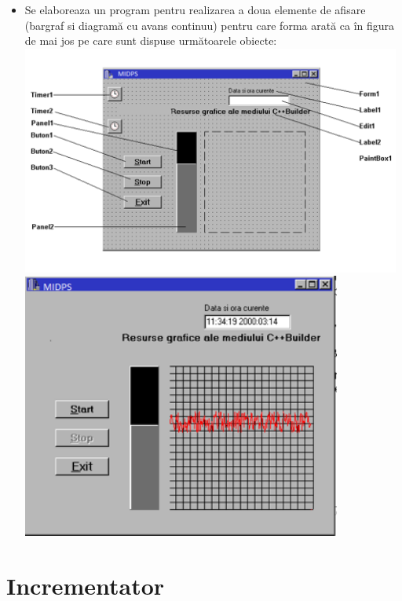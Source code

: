\documentclass[12pt]{article}
\begin{document}
\begin{itemize}
\item Se  elaboreaza  un program pentru realizarea a doua elemente de afisare (bargraf si diagramă cu avans continuu) pentru care forma arată ca în figura de mai jos pe care sunt dispuse următoarele obiecte:\\
\includegraphics[width=12.5cm]{images/4}\\
\includegraphics[width=10.5cm]{images/5}
\end{itemize}
\section {Incrementator}
\end{document}
